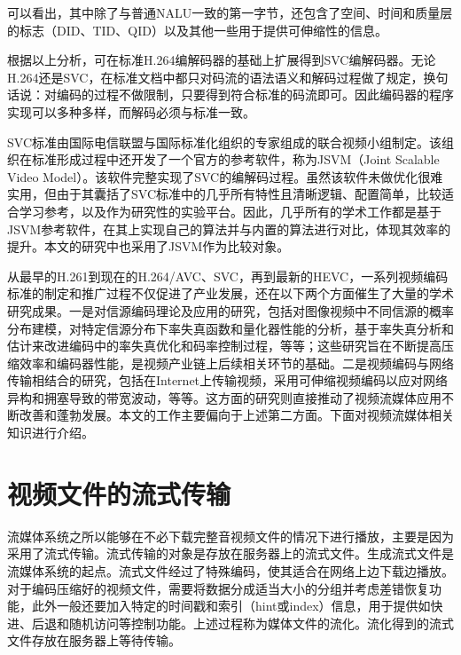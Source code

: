 可以看出，其中除了与普通NALU一致的第一字节，还包含了空间、时间和质量层的标志（DID、TID、QID）以及其他一些用于提供可伸缩性的信息。

根据以上分析，可在标准H.264编解码器的基础上扩展得到SVC编解码器。无论H.264还是SVC，在标准文档中都只对码流的语法语义和解码过程做了规定，换句话说：对编码的过程不做限制，只要得到符合标准的码流即可。因此编码器的程序实现可以多种多样，而解码必须与标准一致。
 
SVC标准由国际电信联盟与国际标准化组织的专家组成的联合视频小组制定。该组织在标准形成过程中还开发了一个官方的参考软件，称为JSVM（Joint Scalable Video Model）\supercite{JSVM}。该软件完整实现了SVC的编解码过程。虽然该软件未做优化很难实用，但由于其囊括了SVC标准中的几乎所有特性且清晰逻辑、配置简单，比较适合学习参考，以及作为研究性的实验平台。因此，几乎所有的学术工作都是基于JSVM参考软件，在其上实现自己的算法并与内置的算法进行对比，体现其效率的提升。本文的研究中也采用了JSVM作为比较对象。

从最早的H.261到现在的H.264/AVC、SVC，再到最新的HEVC，一系列视频编码标准的制定和推广过程不仅促进了产业发展，还在以下两个方面催生了大量的学术研究成果。一是对信源编码理论及应用的研究，包括对图像视频中不同信源的概率分布建模\supercite{Birney-TIP1995, Lam-TIP2000, Sharifi-TCSVT1995, Kamaci-TCSVT2005}，对特定信源分布下率失真函数和量化器性能的分析\supercite{He-TCSVT2001, Gary-TIT1996, Gary-VCIP2005}，基于率失真分析和估计来改进编码中的率失真优化和码率控制过程\supercite{Gary-SPM1998, Lin-TCSVT1998, Sun-TCSVT2006, Lee-TCSVT2014}，等等；这些研究旨在不断提高压缩效率和编码器性能，是视频产业链上后续相关环节的基础。二是视频编码与网络传输相结合的研究\supercite{Sun-book-2001}，包括在Internet上传输视频\supercite{Wu-TCSVT2001, Conklin-TCSVT2001}，采用可伸缩视频编码以应对网络异构和拥塞导致的带宽波动\supercite{Wu-IEEE2001, Ohm-IEEE2005}，等等。这方面的研究则直接推动了视频流媒体应用不断改善和蓬勃发展。本文的工作主要偏向于上述第二方面。下面对视频流媒体相关知识进行介绍。

\section{视频文件的流式传输}

流媒体系统之所以能够在不必下载完整音视频文件的情况下进行播放，主要是因为采用了流式传输。流式传输的对象是存放在服务器上的流式文件。生成流式文件是流媒体系统的起点。流式文件经过了特殊编码，使其适合在网络上边下载边播放。对于编码压缩好的视频文件，需要将数据分成适当大小的分组并考虑差错恢复功能，此外一般还要加入特定的时间戳和索引（hint或index）信息，用于提供如快进、后退和随机访问等控制功能。上述过程称为媒体文件的流化。流化得到的流式文件存放在服务器上等待传输。

